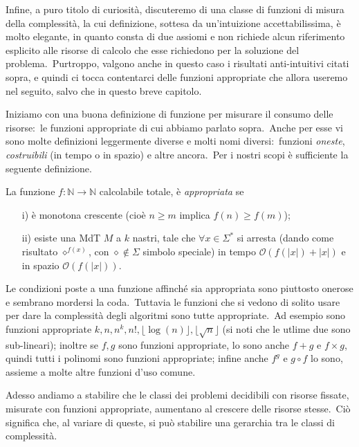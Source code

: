 Infine, a puro titolo di curiosità, discuteremo di una classe di funzioni di misura della complessità, la cui definizione, sottesa da un'intuizione accettabilissima, è molto elegante, in quanto consta di due assiomi e non richiede alcun riferimento esplicito alle risorse di calcolo che esse richiedono per la soluzione del problema.\
Purtroppo, valgono anche in questo caso i risultati anti-intuitivi citati sopra, e quindi ci tocca contentarci delle funzioni appropriate che allora useremo nel seguito, salvo che in questo breve capitolo.\

\medskip
\noindent Iniziamo con una buona definizione di funzione per misurare il consumo delle risorse:\ le funzioni appropriate di cui abbiamo parlato sopra.\
Anche per esse vi sono molte definizioni leggermente diverse e molti nomi diversi:\ funzioni \textit{oneste}, \textit{costruibili} (in tempo o in spazio) e altre ancora.\
Per i nostri scopi è sufficiente la seguente definizione.\

\begin{definition}
    \label{def_appropriata}
    La funzione $f: \mathbb{N} \rightarrow \mathbb{N}$ calcolabile totale, è \textit{appropriata} se
    \begin{itemize}
        \item[i)] è monotona crescente (cioè $n \geq m$ implica $f(n) \geq f(m)$);
        \item[ii)] esiste una MdT $M$ a $k$ nastri, tale che $\forall x \in \Sigma^*$ si arresta (dando come risultato $\diamond^{f(x)}$, con $\diamond \notin \Sigma$ simbolo speciale) in tempo $\mathcal{O}(f(|x|) + |x|)$ e in spazio $\mathcal{O}(f(|x|))$.
    \end{itemize}
\end{definition}

\noindent Le condizioni poste a una funzione affinché sia appropriata sono piuttosto onerose e sembrano mordersi la coda.\
Tuttavia le funzioni che si vedono di solito usare per dare la complessità degli algoritmi sono tutte appropriate.\
Ad esempio sono funzioni appropriate $k, n, n^k, n!, \lfloor \log(n) \rfloor, \lfloor\sqrt{n} \rfloor$ (si noti che le utlime due sono sub-lineari); inoltre se $f,g$ sono funzioni appropriate, lo sono anche $f+g$ e $f\times g$, quindi tutti i polinomi sono funzioni appropriate; infine anche $f^g$ e $g \circ f$ lo sono, assieme a molte altre funzioni d'uso comune.\

Adesso andiamo a stabilire che le classi dei problemi decidibili con risorse fissate, misurate con funzioni appropriate, aumentano al crescere delle risorse stesse.\
Ciò significa che, al variare di queste, si può stabilire una gerarchia tra le classi di complessità.\


